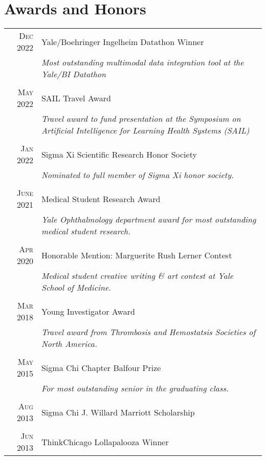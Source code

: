 \documentclass[a4paper,10pt]{article}
\begin{document}
\section{Awards and Honors}
\begin{tabular}{rp{11cm}}
\textsc{Dec} 2022 & Yale/Boehringer Ingelheim Datathon Winner \\
 							    & \small\emph{Most outstanding multimodal data integration tool at the Yale/BI Datathon} \\
 \multicolumn{2}{c}{} \\
 \textsc{May} 2022 & SAIL Travel Award \\
 							    & \small\emph{Travel award to fund presentation at the Symposium on Artificial Intelligence for Learning Health Systems (SAIL)} \\
 \multicolumn{2}{c}{} \\
 \textsc{Jan} 2022 & Sigma Xi Scientific Research Honor Society \\
 							    & \small\emph{Nominated to full member of Sigma Xi honor society.} \\
 \multicolumn{2}{c}{} \\
 \textsc{June} 2021 & Medical Student Research Award \\
 							    & \small\emph{Yale Ophthalmology department  award for most outstanding medical student research.} \\
 \multicolumn{2}{c}{} \\
 \textsc{Apr} 2020 & Honorable Mention: Marguerite Rush Lerner Contest \\
 							    & \small\emph{Medical student creative writing \& art contest at Yale School of Medicine.} \\
 \multicolumn{2}{c}{} \\
 \textsc{Mar} 2018 & Young Investigator Award \\
 							    & \small\emph{Travel award from Thrombosis and Hemostatsis Societies of North America.} \\
 \multicolumn{2}{c}{} \\
 \textsc{May} 2015 & Sigma Chi Chapter Balfour Prize \\
 							    & \small\emph{For most outstanding senior in the graduating class.} \\
 \multicolumn{2}{c}{} \\
 \textsc{Aug} 2013 & Sigma Chi J. Willard Marriott Scholarship \\
 \multicolumn{2}{c}{} \\
 \textsc{Jun} 2013 & ThinkChicago Lollapalooza Winner \\

\end{tabular}
\end{document}
